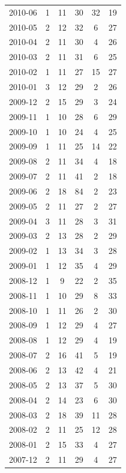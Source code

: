 \documentclass[12pt]{report}
\begin{document}
\begin{longtable}{|c|c|c|c|c|c|}
            2010-06 & 1 & 11 & 30 & 32 & 19 \\
            2010-05 & 2 & 12 & 32 & 6 & 27 \\
            2010-04 & 2 & 11 & 30 & 4 & 26 \\
            2010-03 & 2 & 11 & 31 & 6 & 25 \\
            2010-02 & 1 & 11 & 27 & 15 & 27 \\
            2010-01 & 3 & 12 & 29 & 2 & 26 \\
            2009-12 & 2 & 15 & 29 & 3 & 24 \\
            2009-11 & 1 & 10 & 28 & 6 & 29 \\
            2009-10 & 1 & 10 & 24 & 4 & 25 \\
            2009-09 & 1 & 11 & 25 & 14 & 22 \\
            2009-08 & 2 & 11 & 34 & 4 & 18 \\
            2009-07 & 2 & 11 & 41 & 2 & 18 \\
            2009-06 & 2 & 18 & 84 & 2 & 23 \\
            2009-05 & 2 & 11 & 27 & 2 & 27 \\
            2009-04 & 3 & 11 & 28 & 3 & 31 \\
            2009-03 & 2 & 13 & 28 & 2 & 29 \\
            2009-02 & 1 & 13 & 34 & 3 & 28 \\
            2009-01 & 1 & 12 & 35 & 4 & 29 \\
            2008-12 & 1 & 9 & 22 & 2 & 35 \\
            2008-11 & 1 & 10 & 29 & 8 & 33 \\
            2008-10 & 1 & 11 & 26 & 2 & 30 \\
            2008-09 & 1 & 12 & 29 & 4 & 27 \\
            2008-08 & 1 & 12 & 29 & 4 & 19 \\
            2008-07 & 2 & 16 & 41 & 5 & 19 \\
            2008-06 & 2 & 13 & 42 & 4 & 21 \\
            2008-05 & 2 & 13 & 37 & 5 & 30 \\
            2008-04 & 2 & 14 & 23 & 6 & 30 \\
            2008-03 & 2 & 18 & 39 & 11 & 28 \\
            2008-02 & 2 & 11 & 25 & 12 & 28 \\
            2008-01 & 2 & 15 & 33 & 4 & 27 \\
            2007-12 & 2 & 11 & 29 & 4 & 27 \\

\end{longtable}
\end{document}
